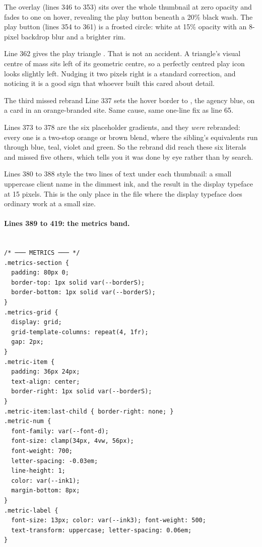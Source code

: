 The overlay (lines 346 to 353) sits over the whole thumbnail at zero opacity and
fades to one on hover, revealing the play button beneath a 20\% black wash. The play
button (lines 354 to 361) is a frosted circle: white at 15\% opacity with an
8-pixel backdrop blur and a brighter rim.

Line 362 gives the play triangle . That is not an accident.
A triangle's visual centre of mass sits left of its geometric centre, so a
perfectly centred play icon looks slightly left. Nudging it two pixels right is a
standard correction, and noticing it is a good sign that whoever built this cared
about detail.

\begin{honest}{The third missed rebrand}
Line 337 sets the hover border to , the agency blue, on
a card in an orange-branded site. Same cause, same one-line fix as line 65.
\end{honest}

Lines 373 to 378 are the six placeholder gradients, and they \emph{were} rebranded:
every one is a two-stop orange or brown blend, where the sibling's equivalents run
through blue, teal, violet and green. So the rebrand did reach these six literals
and missed five others, which tells you it was done by eye rather than by search.

Lines 380 to 388 style the two lines of text under each thumbnail: a small uppercase
client name in the dimmest ink, and the result in the display typeface at 15
pixels. This is the only place in the file where the display typeface does ordinary
work at a small size.

\paragraph{Lines 389 to 419: the metrics band.}

\begin{lstlisting}[firstnumber=389,caption={\file{css/site.css}, lines 389--419}]

/* ─── METRICS ─── */
.metrics-section {
  padding: 80px 0;
  border-top: 1px solid var(--borderS);
  border-bottom: 1px solid var(--borderS);
}
.metrics-grid {
  display: grid;
  grid-template-columns: repeat(4, 1fr);
  gap: 2px;
}
.metric-item {
  padding: 36px 24px;
  text-align: center;
  border-right: 1px solid var(--borderS);
}
.metric-item:last-child { border-right: none; }
.metric-num {
  font-family: var(--font-d);
  font-size: clamp(34px, 4vw, 56px);
  font-weight: 700;
  letter-spacing: -0.03em;
  line-height: 1;
  color: var(--ink1);
  margin-bottom: 8px;
}
.metric-label {
  font-size: 13px; color: var(--ink3); font-weight: 500;
  text-transform: uppercase; letter-spacing: 0.06em;
}
\end{lstlisting}

